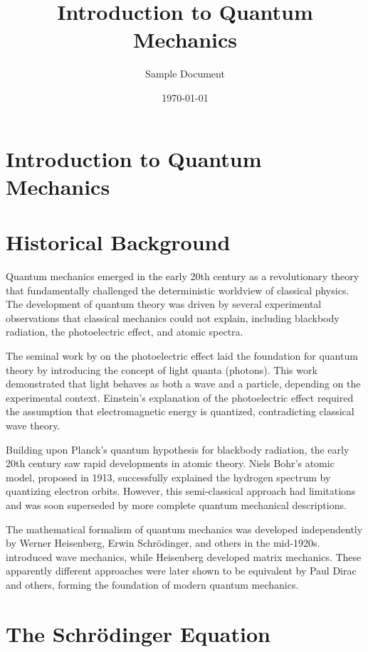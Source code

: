 \documentclass[11pt,a4paper]{article}
\title{Introduction to Quantum Mechanics}
\author{Sample Document}
\date{\today}
\begin{document}
\maketitle

\section{Introduction to Quantum Mechanics}

\section{Historical Background}

Quantum mechanics emerged in the early 20th century as a revolutionary theory that fundamentally challenged the deterministic worldview of classical physics. The development of quantum theory was driven by several experimental observations that classical mechanics could not explain, including blackbody radiation, the photoelectric effect, and atomic spectra.

The seminal work by \cite{einstein1905} on the photoelectric effect laid the foundation for quantum theory by introducing the concept of light quanta (photons). This work demonstrated that light behaves as both a wave and a particle, depending on the experimental context. Einstein's explanation of the photoelectric effect required the assumption that electromagnetic energy is quantized, contradicting classical wave theory.

Building upon Planck's quantum hypothesis for blackbody radiation, the early 20th century saw rapid developments in atomic theory. Niels Bohr's atomic model, proposed in 1913, successfully explained the hydrogen spectrum by quantizing electron orbits. However, this semi-classical approach had limitations and was soon superseded by more complete quantum mechanical descriptions.

The mathematical formalism of quantum mechanics was developed independently by Werner Heisenberg, Erwin Schrödinger, and others in the mid-1920s. \cite{schrodinger1926} introduced wave mechanics, while Heisenberg developed matrix mechanics. These apparently different approaches were later shown to be equivalent by Paul Dirac and others, forming the foundation of modern quantum mechanics.

\section{The Schrödinger Equation}
\end{document}
